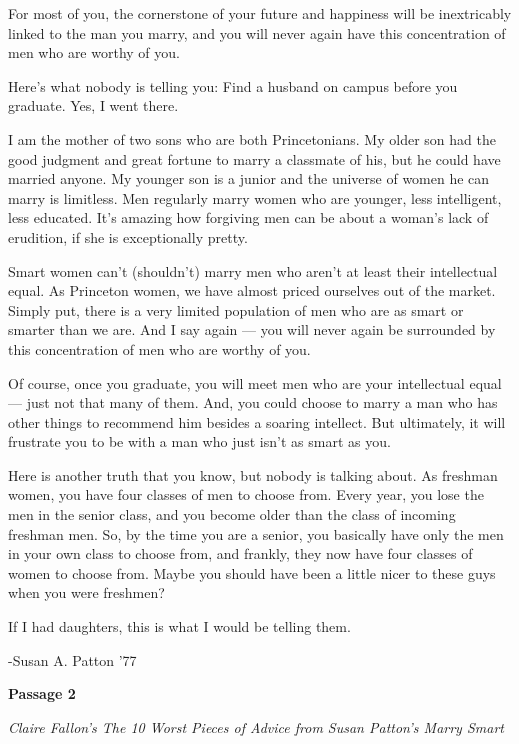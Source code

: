\documentclass[12pt]{book}
\renewcommand{\indent}{\hspace{1cm}}
\begin{document}
\begin{linenumbers*}
\indent For most of you, the cornerstone of your future and happiness will be inextricably linked to the man you marry, and you will never again have this concentration of men who are worthy of you.

\indent Here's what nobody is telling you: Find a husband on campus before you graduate. Yes, I went there.

\indent I am the mother of two sons who are both Princetonians. My older son had the good judgment and great fortune to marry a classmate of his, but he could have married anyone. My younger son is a junior and the universe of women he can marry is limitless. Men regularly marry women who are younger, less intelligent, less educated. It's amazing how forgiving men can be about a woman's lack of erudition, if she is exceptionally pretty.

\indent Smart women can't (shouldn't) marry men who aren't at least their intellectual equal. As Princeton women, we have almost priced ourselves out of the market. Simply put, there is a very limited population of men who are as smart or smarter than we are. And I say again — you will never again be surrounded by this concentration of men who are worthy of you.

\indent Of course, once you graduate, you will meet men who are your intellectual equal — just not that many of them. And, you could choose to marry a man who has other things to recommend him besides a soaring intellect. But ultimately, it will frustrate you to be with a man who just isn't as smart as you.

\indent Here is another truth that you know, but nobody is talking about. As freshman women, you have four classes of men to choose from. Every year, you lose the men in the senior class, and you become older than the class of incoming freshman men. So, by the time you are a senior, you basically have only the men in your own class to choose from, and frankly, they now have four classes of women to choose from. Maybe you should have been a little nicer to these guys when you were freshmen?

\bigskip
If I had daughters, this is what I would be telling them.
\end{linenumbers*}

-Susan A. Patton '77

\bigskip
\textbf{Passage 2}

\textit{Claire Fallon's The 10 Worst Pieces of Advice from Susan Patton's Marry Smart}
\end{document}
